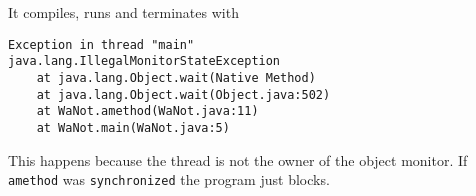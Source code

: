 \section{}
It compiles, runs and terminates with
\begin{lstlisting}[basicstyle=\ttfamily]
Exception in thread "main"
java.lang.IllegalMonitorStateException
    at java.lang.Object.wait(Native Method)
    at java.lang.Object.wait(Object.java:502)
    at WaNot.amethod(WaNot.java:11)
    at WaNot.main(WaNot.java:5)
\end{lstlisting}

This happens because the thread is not the owner of the object monitor.
If \texttt{amethod} was \texttt{synchronized} the program just blocks.